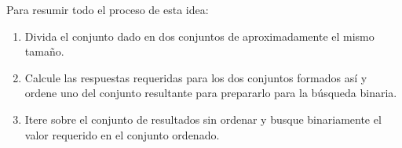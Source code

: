 
Para resumir todo el proceso de esta idea:

\begin{enumerate}
	\item Divida el conjunto dado en dos conjuntos de aproximadamente el mismo tamaño.
	\item Calcule las respuestas requeridas para los dos conjuntos formados así y ordene uno del conjunto resultante para prepararlo para la búsqueda binaria.
	\item Itere sobre el conjunto de resultados sin ordenar y busque binariamente el valor requerido en el conjunto ordenado.
\end{enumerate}





